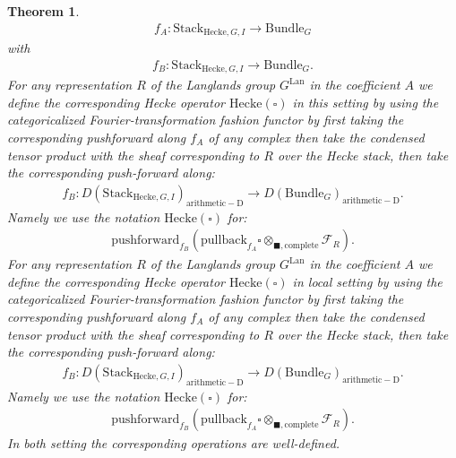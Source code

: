 \documentclass[12pt]{book}
\newtheorem{theorem}{Theorem}
\theoremstyle{definition}
\begin{document}
\begin{theorem}
\begin{align}
f_A: \mathrm{Stack}_{\mathrm{Hecke},G,I} \rightarrow \mathrm{Bundle}_{G}
\end{align}
with
\begin{align}
f_B: \mathrm{Stack}_{\mathrm{Hecke},G,I} \rightarrow \mathrm{Bundle}_{G}.
\end{align}
For any representation $R$ of the Langlands group $G^\mathrm{Lan}$ in the coefficient $A$ we define the corresponding Hecke operator $\mathrm{Hecke}(\square)$ in this setting by using the categoricalized Fourier-transformation fashion functor by first taking the corresponding pushforward along $f_A$ of any complex then take the condensed tensor product with the sheaf corresponding to $R$ over the Hecke stack, then take the corresponding push-forward along:
\begin{align}
f_B: D(\mathrm{Stack}_{\mathrm{Hecke},G,I})_{\mathrm{arithmetic-D}}\rightarrow D(\mathrm{Bundle}_{G})_{\mathrm{arithmetic-D}}.
\end{align}
Namely we use the notation $\mathrm{Hecke}(\square)$ for:
\begin{align}
\mathrm{pushforward}_{f_B}(\mathrm{pullback}_{f_A}\square\otimes_{\blacksquare,\mathrm{complete}}\mathcal{F}_R).
\end{align}
For any representation $R$ of the Langlands group $G^\mathrm{Lan}$ in the coefficient $A$ we define the corresponding Hecke operator $\mathrm{Hecke}(\square)$ in local setting by using the categoricalized Fourier-transformation fashion functor by first taking the corresponding pushforward along $f_A$ of any complex then take the condensed tensor product with the sheaf corresponding to $R$ over the Hecke stack, then take the corresponding push-forward along:
\begin{align}
f_B: D(\mathrm{Stack}_{\mathrm{Hecke},G,I})_{\mathrm{arithmetic-D}} \rightarrow D(\mathrm{Bundle}_{G})_{\mathrm{arithmetic-D}}.
\end{align}
Namely we use the notation $\mathrm{Hecke}(\square)$ for:
\begin{align}
\mathrm{pushforward}_{f_B}(\mathrm{pullback}_{f_A}\square\otimes_{\blacksquare,\mathrm{complete}}\mathcal{F}_R).
\end{align}
In both setting the corresponding operations are well-defined.
\end{theorem}
\end{document}
